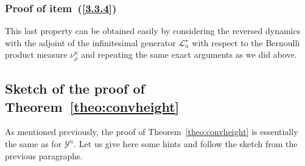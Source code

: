 \documentclass[10pt]{amsart}
\theoremstyle{definition}\newtheorem{defi}[theo]{Definition}\newtheorem{rema}[theo]{Remark}\newtheorem{exam}[theo]{Example}\newtheorem{exem}[theo]{Example}\newtheorem{nota}[theo]{Notation}
\newcommand{\mc}[1]{{\mathcal #1}}
\renewcommand{\mc}[1]{{\mathcal #1}}
\begin{document}
\subsubsection{Proof of item~(\ref{3.3.4})}

This last property can be obtained easily by considering the reversed dynamics with the adjoint of the infinitesimal generator $\mc L_n^\star$ with respect to the Bernoulli product measure $\nu^n_{\rho}$ and repeating the same exact arguments as we did above.

\subsection{Sketch of the proof of Theorem~\ref{theo:convheight}}\label{app:height}

As mentioned previously, the proof of Theorem~\ref{theo:convheight} is essentially the same as for $\mc Y^n$. Let us give here some hints and follow the sketch from the previous paragraphs.
\end{document}
